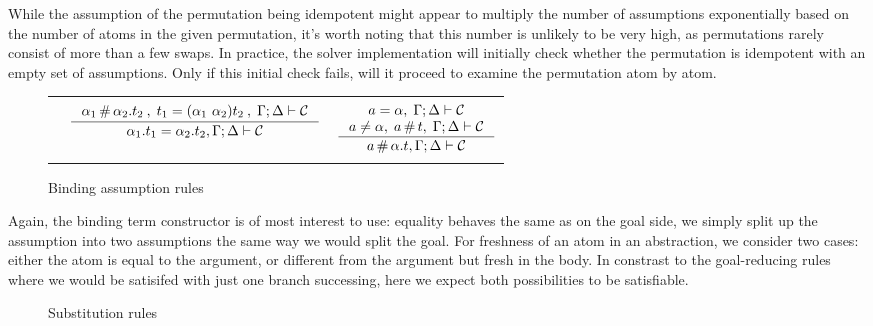 \documentclass[english, mgr]{iithesis}
\newcommand{\solverRule}{\vdash}
\newcommand{\scbrk}[2]{\myatop{\textsc{#1}}{\textsc{#2}}}
\begin{document}
While the assumption of the permutation being idempotent might appear to multiply the number of assumptions exponentially based on the number of atoms in the given permutation,
it's worth noting that this number is unlikely to be very high, as permutations rarely consist of more than a few swaps.
In practice, the solver implementation will initially check whether the permutation is idempotent with an empty set of assumptions.
Only if this initial check fails, will it proceed to examine the permutation atom by atom.

\begin{figure}[htpb]
  \centering
  \begin{tabularx}{\textwidth}{|cCC|}
  \hline & & \\ & $
  \inference{
    \atomexp_1 \cfresh \tbind{\atomexp_2} \term_2\:,\;
      \term_1 = \permswap{\atomexp_1}{\atomexp_2}\term_2 \:, \;
      \cEnv ; \icEnv \solverRule \sconstr
  }{
    \tbind{\atomexp_1} \term_1 \ceq \tbind{\atomexp_2} \term_2 , \cEnv ; \icEnv \solverRule \sconstr
  } $ & $
  \inference{
    \atomv \ceq \atomexp, \; \cEnv ; \icEnv \solverRule \sconstr
    \\
    \atomv \cneq \atomexp, \; \atomv \cfresh \term,\;\cEnv ; \icEnv \solverRule \sconstr
  }{
    \atomv \cfresh \tbind{\atomexp} \term , \cEnv ; \icEnv \solverRule \sconstr
  } $ \\ & & \\ \hline
  \end{tabularx}
  \caption{Binding assumption rules}
  \label{fig:abstraction}
\end{figure}
Again, the binding term constructor is of most interest to use:
equality behaves the same as on the goal side, we simply
split up the assumption into two assumptions the same way we would split the goal.
For freshness of an atom in an abstraction, we consider two cases:
either the atom is equal to the argument,
or different from the argument but fresh in the body.
In constrast to the goal-reducing rules where we would be satisifed with
just one branch successing, here we expect both possibilities to be satisfiable.

\begin{figure}[htpb]
  \centering
  \framebox[\textwidth]{
    \begin{tabularx}{\textwidth}{C}
      \\ $
      \inference{
        \cEnv\subst{\termv}{\term} ; \icEnv\subst{\termv}{\term}
          \solverRule \sconstr\subst{\termv}{\term}
      }{
        \termv = \term, \cEnv ; \icEnv \solverRule \sconstr
      }\:\scbrk{Subst}{Term}$ \\ \\
      $
      \inference{
        \cEnv \subst{\atomv_1}{\atomv_2}; \icEnv\subst{\atomv_1}{\atomv_2}
          \solverRule \sconstr\subst{\atomv_1}{\atomv_2}
      }{
        \atomv_1 \ceq \atomv_2, \cEnv ; \icEnv \solverRule \sconstr
      }\:\scbrk{Subst}{Atom}$ \\ \\
    \end{tabularx}
  }
  \caption{Substitution rules}
  \label{fig:substitution}
\end{figure}
\end{document}
